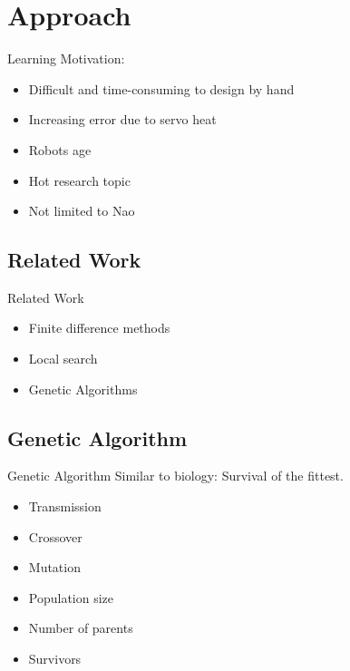 \documentclass{beamer}
\begin{document}
\section{Approach}
\begin{frame}{Learning}
	Motivation:
	\begin{itemize}
		\item Difficult and time-consuming to design by hand
		\item Increasing error due to servo heat
		\item Robots age
		\item Hot research topic
		\item Not limited to Nao
	\end{itemize}
\end{frame}

\subsection{Related Work}
\begin{frame}{Related Work}
    \begin{itemize}
		\item Finite difference methods
		\item Local search
        \item Genetic Algorithms
	\end{itemize}
\end{frame}

\subsection{Genetic Algorithm}
\begin{frame}{Genetic Algorithm}
	Similar to biology: Survival of the fittest.
    \begin{itemize}
		\item Transmission
		\item Crossover
		\item Mutation
	\end{itemize}

	\begin{itemize}
		\item Population size 
		\item Number of parents
		\item Survivors
	\end{itemize}
\end{frame}
\end{document}
